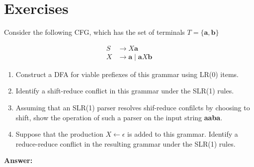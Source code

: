 \documentclass[a4paper]{article}
\theoremstyle{definition}
\begin{document}
\section{Exercises}
Consider the following CFG, which has the set of terminals $T=\{\mathbf{a}, \mathbf{b}\}$

$$\begin{aligned} S & \rightarrow X \mathbf{a} \\ X & \rightarrow \mathbf{a} \mid \mathbf{a} X \mathbf{b} \end{aligned}$$
\begin{enumerate}
\item Construct a DFA for viable prefiexes of this grammar using LR(0) items.
\item Identify a shift-reduce conflict in this grammar under the SLR(1) rules.
\item Assuming that an SLR(1) parser resolves shif-reduce confilcts by choosing to shift, show the operation of such a parser on the input string \textbf{aaba}.
\item Suppose that the production $X\leftarrow \epsilon$ is added to this grammar. Identify a reduce-reduce conflict in the resulting grammar under the SLR(1) rules.
\end{enumerate}
\textbf{Answer:}
\end{document}
